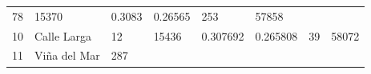 \documentclass[]{article}
\begin{document}
\begin{longtable}[]{@{}llllllll@{}}
\begin{minipage}[t]{0.14\columnwidth}
78\strut
\end{minipage} & \begin{minipage}[t]{0.13\columnwidth}\raggedright
15370\strut
\end{minipage} & \begin{minipage}[t]{0.10\columnwidth}\raggedright
0.3083\strut
\end{minipage} & \begin{minipage}[t]{0.09\columnwidth}\raggedright
0.26565\strut
\end{minipage} & \begin{minipage}[t]{0.10\columnwidth}\raggedright
253\strut
\end{minipage} & \begin{minipage}[t]{0.10\columnwidth}\raggedright
57858\strut
\end{minipage}\tabularnewline
\begin{minipage}[t]{0.03\columnwidth}\raggedright
10\strut
\end{minipage} & \begin{minipage}[t]{0.09\columnwidth}\raggedright
Calle Larga\strut
\end{minipage} & \begin{minipage}[t]{0.14\columnwidth}\raggedright
12\strut
\end{minipage} & \begin{minipage}[t]{0.13\columnwidth}\raggedright
15436\strut
\end{minipage} & \begin{minipage}[t]{0.10\columnwidth}\raggedright
0.307692\strut
\end{minipage} & \begin{minipage}[t]{0.09\columnwidth}\raggedright
0.265808\strut
\end{minipage} & \begin{minipage}[t]{0.10\columnwidth}\raggedright
39\strut
\end{minipage} & \begin{minipage}[t]{0.10\columnwidth}\raggedright
58072\strut
\end{minipage}\tabularnewline
\begin{minipage}[t]{0.03\columnwidth}\raggedright
11\strut
\end{minipage} & \begin{minipage}[t]{0.09\columnwidth}\raggedright
Viña del Mar\strut
\end{minipage} & \begin{minipage}[t]{0.14\columnwidth}\raggedright
287\strut
\end{minipage} & \begin{minipage}[t]{0.13\columnwidth}\raggedright

\end{minipage}
\end{longtable}
\end{document}
